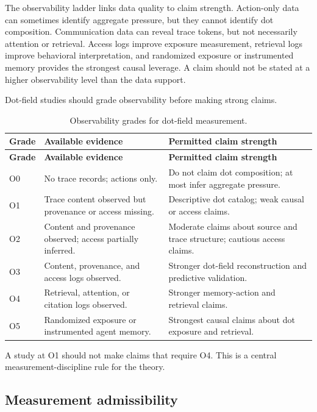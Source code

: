 \documentclass[11pt]{article}
\theoremstyle{remark}
\begin{document}
The observability ladder links data quality to claim strength. Action-only data can sometimes identify aggregate pressure, but they cannot identify dot composition. Communication data can reveal trace tokens, but not necessarily attention or retrieval. Access logs improve exposure measurement, retrieval logs improve behavioral interpretation, and randomized exposure or instrumented memory provides the strongest causal leverage. A claim should not be stated at a higher observability level than the data support.


Dot-field studies should grade observability before making strong claims.

{\small
\begin{longtable}{L{0.12\textwidth}L{0.36\textwidth}L{0.40\textwidth}}
\caption{Observability grades for dot-field measurement.}\label{tab:measurement-observability-ladder}\\
\toprule
\textbf{Grade} & \textbf{Available evidence} & \textbf{Permitted claim strength}\\
\midrule
\endfirsthead
\toprule
\textbf{Grade} & \textbf{Available evidence} & \textbf{Permitted claim strength}\\
\midrule
\endhead
\bottomrule
\endlastfoot
O0 & No trace records; actions only. & Do not claim dot composition; at most infer aggregate pressure.\\
O1 & Trace content observed but provenance or access missing. & Descriptive dot catalog; weak causal or access claims.\\
O2 & Content and provenance observed; access partially inferred. & Moderate claims about source and trace structure; cautious access claims.\\
O3 & Content, provenance, and access logs observed. & Stronger dot-field reconstruction and predictive validation.\\
O4 & Retrieval, attention, or citation logs observed. & Stronger memory-action and retrieval claims.\\
O5 & Randomized exposure or instrumented agent memory. & Strongest causal claims about dot exposure and retrieval.\\
\end{longtable}
}

A study at O1 should not make claims that require O4. This is a central
measurement-discipline rule for the theory.

\subsection{Measurement admissibility}\label{measurement-admissibility}
\end{document}
